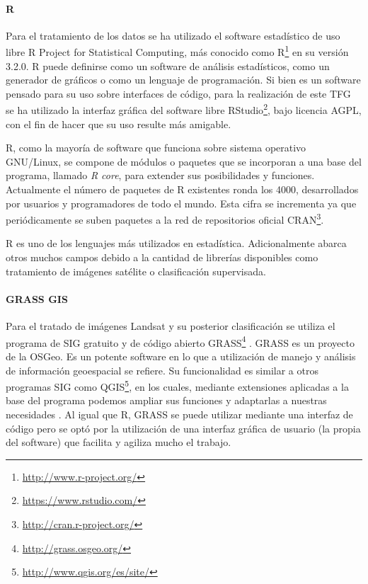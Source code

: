\paragraph{R}
Para el tratamiento de los datos se ha utilizado el software estadístico de uso libre R Project for Statistical Computing, más conocido como R\footnote{\url{http://www.r-project.org/}} \citep{R2013} en su versión 3.2.0. R puede definirse como un software de análisis estadísticos, como un generador de gráficos o como un lenguaje de programación. Si bien es un software pensado para su uso sobre interfaces de código, para la realización de este \ac{TFG} se ha utilizado la interfaz gráfica del software libre RStudio\footnote{\url{https://www.rstudio.com/}}, bajo licencia AGPL, con el fin de hacer que su uso resulte más amigable.%

R, como la mayoría de software que funciona sobre sistema operativo GNU/Linux, se compone de módulos o paquetes que se incorporan a una base del programa, llamado \textit{R core}, para extender sus posibilidades y funciones. Actualmente el número de paquetes de R existentes ronda los 4000, desarrollados por usuarios y programadores de todo el mundo. Esta cifra se incrementa ya que periódicamente se suben paquetes a la red de repositorios oficial \ac{CRAN}\footnote{\url{http://cran.r-project.org/}}.%

R es uno de los lenguajes más utilizados en estadística. Adicionalmente abarca otros muchos campos debido a la cantidad de librerías disponibles como tratamiento de imágenes satélite o clasificación supervisada.

\paragraph{GRASS GIS}
Para el tratado de imágenes Landsat y su posterior clasificación se utiliza el programa de \ac{SIG} gratuito y de código abierto \ac{GRASS}\footnote{\url{http://grass.osgeo.org/}} \citep{GRASS_GIS_software}. GRASS es un proyecto de la \ac{OSGeo}. Es un potente software en lo que a utilización de manejo y análisis de información geoespacial se refiere. Su funcionalidad es similar a otros programas \ac{SIG} como QGIS\footnote{\url{http://www.qgis.org/es/site/}}, en los cuales, mediante extensiones aplicadas a la base del programa podemos ampliar sus funciones y adaptarlas a nuestras necesidades \citep{neteler2002open}. Al igual que R, \ac{GRASS} se puede utilizar mediante una interfaz de código pero se optó por la utilización de una interfaz gráfica de usuario (la propia del software) que facilita y agiliza mucho el trabajo.%

